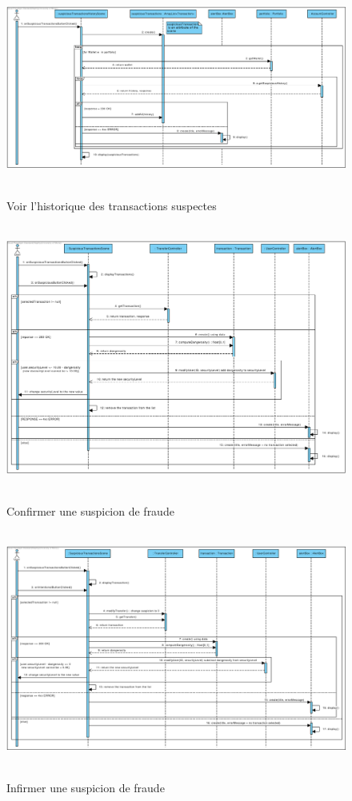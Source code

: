 \documentclass[]{report}
\begin{document}
\newpage

\begin{figure}[h!]
\hbox{
	\centering\includegraphics[width=\linewidth]{img/Sequence 6 - Extension 6.pdf}
}
\caption{Voir l'historique des transactions suspectes}
\end{figure}

\newpage

\begin{figure}[h!]
\hbox{
	\centering\includegraphics[width=\linewidth]{img/Sequence 7 - Extension 6.pdf}
}
\caption{Confirmer une suspicion de fraude}
\end{figure}

\newpage

\begin{figure}[h!]
\hbox{
	\centering\includegraphics[width=\linewidth]{img/Sequence 8 - Extension 6.pdf}
}
\caption{Infirmer une suspicion de fraude}
\end{figure}
\end{document}
